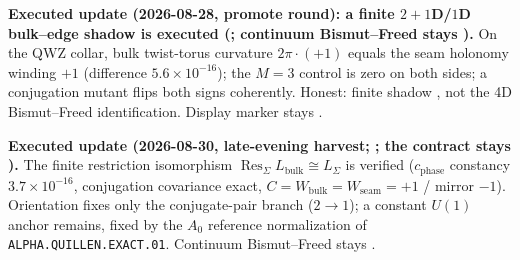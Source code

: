\par\smallskip\noindent\textbf{Executed update (2026-08-28, promote round): a finite $2{+}1$D/$1$D
bulk--edge shadow is executed
(; continuum
Bismut--Freed stays \mO).}
On the QWZ collar, bulk twist-torus curvature $2\pi\cdot(+1)$ equals the seam holonomy winding
$+1$ (difference $5.6\times10^{-16}$); the $M=3$ control is zero on both sides; a conjugation
mutant flips both signs coherently.  Honest: finite shadow \mE, not the 4D Bismut--Freed
identification.  Display marker stays \mO.

\par\smallskip\noindent\textbf{Executed update (2026-08-30, late-evening harvest;
; the contract stays \mO).}
The finite restriction isomorphism $\operatorname{Res}_\Sigma L_{\mathrm{bulk}}\cong L_\Sigma$
is verified ($c_{\mathrm{phase}}$ constancy $3.7{\times}10^{-16}$, conjugation covariance exact,
$C=W_{\mathrm{bulk}}=W_{\mathrm{seam}}=+1$ / mirror $-1$).  Orientation fixes only the
conjugate-pair branch ($2\to1$); a constant $U(1)$ anchor remains, fixed by the $A_0$
reference normalization of \texttt{ALPHA.QUILLEN.EXACT.01}.  Continuum Bismut--Freed stays \mO.

